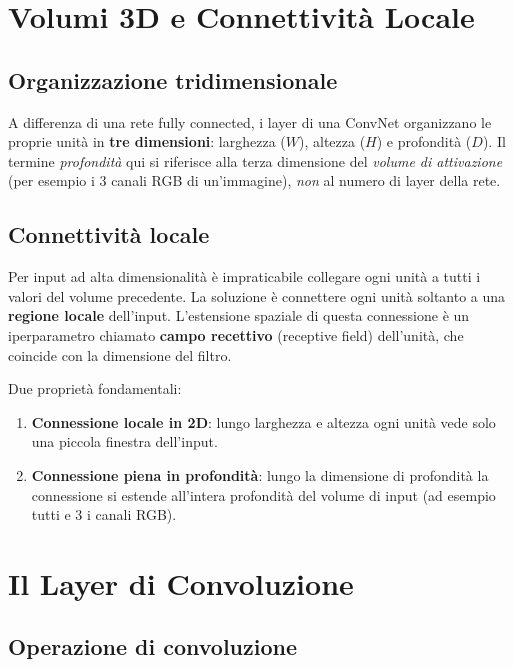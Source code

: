 \section{Volumi 3D e Connettività Locale}
\label{sec:3d-volumes}

\subsection{Organizzazione tridimensionale}
\label{subsec:3d-org}

A differenza di una rete fully connected, i layer di una ConvNet organizzano le proprie unità
in \textbf{tre dimensioni}: larghezza ($W$), altezza ($H$) e profondità ($D$). Il termine
\emph{profondità} qui si riferisce alla terza dimensione del \emph{volume di attivazione} (per
esempio i 3 canali RGB di un'immagine), \emph{non} al numero di layer della rete.

\subsection{Connettività locale}
\label{subsec:local-connectivity}

Per input ad alta dimensionalità è impraticabile collegare ogni unità a tutti i valori del
volume precedente. La soluzione è connettere ogni unità soltanto a una \textbf{regione locale}
dell'input. L'estensione spaziale di questa connessione è un iperparametro chiamato
\textbf{campo recettivo} (receptive field) dell'unità, che coincide con la dimensione del
filtro.

Due proprietà fondamentali:
\begin{enumerate}
  \item \textbf{Connessione locale in 2D}: lungo larghezza e altezza ogni unità vede solo una
        piccola finestra dell'input.
  \item \textbf{Connessione piena in profondità}: lungo la dimensione di profondità la
        connessione si estende all'intera profondità del volume di input (ad esempio tutti e 3
        i canali RGB).
\end{enumerate}

\section{Il Layer di Convoluzione}
\label{sec:conv-layer}

\subsection{Operazione di convoluzione}
\label{subsec:conv-operation}

